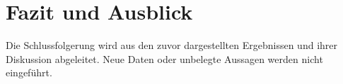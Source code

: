 \chapter{Fazit und Ausblick}
\label{chap:conclusion}

Die Schlussfolgerung wird aus den zuvor dargestellten Ergebnissen und
ihrer Diskussion abgeleitet. Neue Daten oder unbelegte Aussagen werden
nicht eingeführt.

